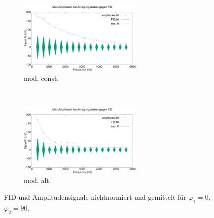 \documentclass{article}
\begin{document}
        \begin{figure}[h]
            \centering
            \begin{subfigure}[b]{0.4\textwidth}
                \centering
                \includegraphics[width=6cm]{../Bilddateien/CPMG-0-90-constant-avg.png}
                \caption{mod. const.}
                \label{fig:CPMG-0-90-constant-avg}
            \end{subfigure}
            \
            \begin{subfigure}[b]{0.4\textwidth}
                \centering
                \includegraphics[width=6cm]{../Bilddateien/CPMG-0-90-alternating-avg.png}
                \caption{mod. alt.}
                \label{fig:CPMG-0-90-alternating-avg}
            \end{subfigure}
            \caption{FID und Amplitudensignale nichtnormiert und gemittelt für $\varphi_1 = 0$, $\varphi_2 = 90$.}
            \label{fig:CPMG-0-90-avg}
        \end{figure}
        
\end{document}
